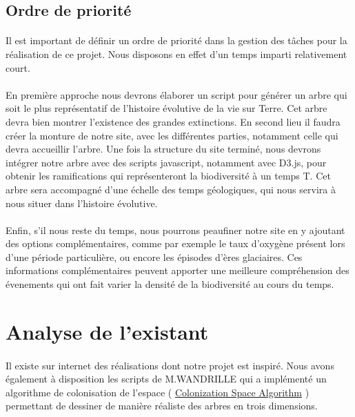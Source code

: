 \documentclass[a4paper]{article}
\begin{document}
	\subsection{Ordre de priorité}
		\paragraph{}
		Il est important de définir un ordre de priorité dans la gestion des tâches pour la réalisation de ce projet. Nous disposons en effet d'un temps imparti relativement court.

		\paragraph{}
		En première approche nous devrons élaborer un script pour générer un arbre qui soit le plus représentatif de l'histoire évolutive de la vie sur Terre. Cet arbre devra bien montrer l'existence des grandes extinctions. 
		En second lieu il faudra créer la monture de notre site, avec les différentes parties, notamment celle qui devra accueillir l'arbre. 
		Une fois la structure du site terminé, nous devrons intégrer notre arbre avec des scripts javascript, notamment avec D3.js, pour obtenir les ramifications qui représenteront la biodiversité à un temps T. Cet arbre sera accompagné d'une échelle des temps géologiques, qui nous servira à nous situer dans l'histoire évolutive.

		\paragraph{}
		Enfin, s'il nous reste du temps, nous pourrons peaufiner notre site en y ajoutant des options complémentaires, comme par exemple le taux d'oxygène présent lors d'une période particulière, ou encore les épisodes d'ères glaciaires. Ces informations complémentaires peuvent apporter une meilleure compréhension des évenements qui ont fait varier la densité de la biodiversité au cours du temps.

\section{Analyse de l'existant}
\paragraph{}
Il existe sur internet des réalisations dont notre projet est inspiré. Nous avons également à disposition les scripts de M.WANDRILLE qui a implémenté un algorithme de colonisation de l'espace ( \hyperref[Ref]{Colonization Space Algorithm} ) permettant de dessiner de manière réaliste des arbres en trois dimensions.     
	      	 
\end{document}
